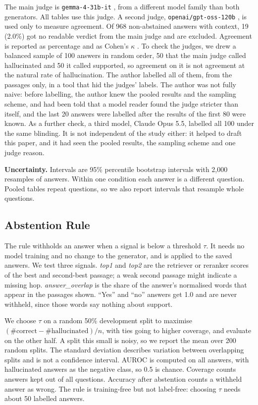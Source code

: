 \documentclass[10pt,a4paper,twocolumn]{article}
\newcommand{\model}[1]{\texttt{#1}}
\begin{document}
The main judge is \model{gemma-4-31b-it} \cite{gemma2026gemma4}, from a different model family than both generators. All tables use
this judge. A second judge, \model{openai/gpt-oss-120b} \cite{openai2025gptoss}, is used only to measure agreement. Of 968 non-abstained
answers with context, 19 (2.0\%) got no readable verdict from the main judge and are excluded.
Agreement is reported as percentage and as Cohen's $\kappa$ \cite{cohen1960kappa}.
To check the judges, we drew a balanced sample of 100 answers in random order, 50 that the main judge called hallucinated and 50 it called supported, so agreement on it is not agreement at the natural rate of hallucination. The author labelled all of them, from the passages only, in a tool that hid the judges' labels. The author was not fully naive: before labelling, the author knew the pooled results and the sampling scheme, and had been told that a model reader found the judge stricter than itself, and the last 20 answers were labelled after the results of the first 80 were known. As a further check, a third model, Claude Opus 5.5, labelled all 100 under the same blinding. It is not independent of the study either: it helped to draft this paper, and it had seen the pooled results, the sampling scheme and one judge reason.

\textbf{Uncertainty.} Intervals are 95\% percentile bootstrap intervals \cite{efron1993bootstrap} with 2,000 resamples of answers.
Within one condition each answer is a different question. Pooled tables repeat questions, so we also report intervals that resample
whole questions.

\subsection{Abstention Rule}
The rule withholds an answer when a signal is below a threshold $\tau$. It needs no model training and no change to the generator, and
is applied to the saved answers. We test three signals. \emph{top1} and \emph{top2} are the retriever or reranker scores of the best
and second-best passage; a weak second passage might indicate a missing hop. \emph{answer\_overlap} is the share of the answer's
normalised words that appear in the passages shown. ``Yes'' and ``no'' answers get 1.0 and are never withheld, since those words say
nothing about support.

We choose $\tau$ on a random 50\% development split to maximise $(\#\text{correct}-\#\text{hallucinated})/n$, with ties going to
higher coverage, and evaluate on the other half. A split this small is noisy, so we report the mean over 200 random splits. The
standard deviation describes variation between overlapping splits and is not a confidence interval. AUROC is computed on all answers,
with hallucinated answers as the negative class, so 0.5 is chance. Coverage counts answers kept out of all questions. Accuracy after
abstention counts a withheld answer as wrong. The rule is training-free but not label-free: choosing $\tau$ needs about 50 labelled answers.
\end{document}
